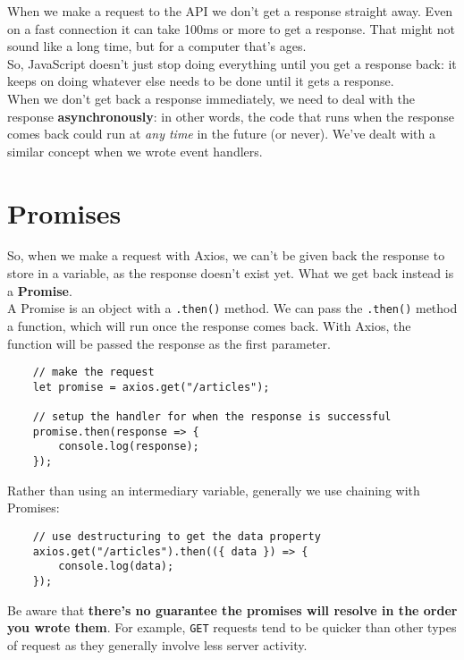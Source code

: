 When we make a request to the API we don't get a response straight away. Even on a fast connection it can take 100ms or more to get a response. That might not sound like a long time, but for a computer that's ages.
\\

So, JavaScript doesn't just stop doing everything until you get a response back: it keeps on doing whatever else needs to be done until it gets a response.
\\

When we don't get back a response immediately, we need to deal with the response \textbf{asynchronously}: in other words, the code that runs when the response comes back could run at \textit{any time} in the future (or never).  We've dealt with a similar concept when we wrote event handlers.


\section{Promises}

So, when we make a request with Axios, we can't be given back the response to store in a variable, as the response doesn't exist yet. What we get back instead is a \textbf{Promise}.
\\

A Promise is an object with a \texttt{.then()} method. We can pass the \texttt{.then()} method a function, which will run once the response comes back. With Axios, the function will be passed the response as the first parameter.

\begin{verbatim}
    // make the request
    let promise = axios.get("/articles");

    // setup the handler for when the response is successful
    promise.then(response => {
        console.log(response);
    });
\end{verbatim}

Rather than using an intermediary variable, generally we use chaining with Promises:

\begin{verbatim}
    // use destructuring to get the data property
    axios.get("/articles").then(({ data }) => {
        console.log(data);
    });
\end{verbatim}

Be aware that \textbf{there's no guarantee the promises will resolve in the order you wrote them}. For example, \texttt{GET} requests tend to be quicker than other types of request as they generally involve less server activity.
\\

